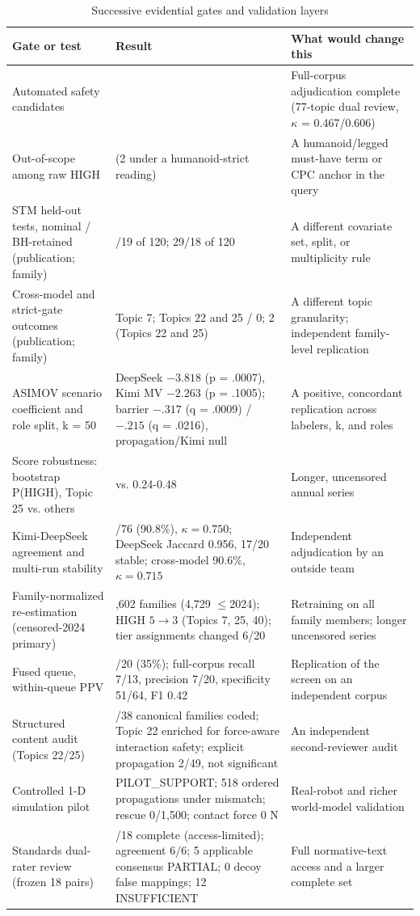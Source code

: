\documentclass[letterpaper,9pt,conference]{ieeeconf}
\begin{document}
\begin{table}[!b]
\centering
\caption{Successive evidential gates and validation layers}
\label{tab:layers}
\scriptsize
\renewcommand{\arraystretch}{0.92}
\begin{tabularx}{\textwidth}{@{}>{\raggedright\arraybackslash}X >{\raggedright\arraybackslash}X >{\raggedright\arraybackslash}X@{}}
\toprule
\textbf{Gate or test} & \textbf{Result} & \textbf{What would change this} \\
\midrule
Automated safety candidates & 20 & Full-corpus adjudication complete (77-topic dual review, $\kappa$ = 0.467/0.606) \\
Out-of-scope among raw HIGH & 1 (2 under a humanoid-strict reading) & A humanoid/legged must-have term or CPC anchor in the query \\
STM held-out tests, nominal / BH-retained (publication; family) & 38/19 of 120; 29/18 of 120 & A different covariate set, split, or multiplicity rule \\
Cross-model and strict-gate outcomes (publication; family) & Topic 7; Topics 22 and 25 / 0; 2 (Topics 22 and 25) & A different topic granularity; independent family-level replication \\
ASIMOV scenario coefficient and role split, k = 50 & DeepSeek $-3.818$ (p = .0007), Kimi MV $-2.263$ (p = .1005); barrier $-.317$ (q = .0009) / $-.215$ (q = .0216), propagation/Kimi null & A positive, concordant replication across labelers, k, and roles \\
Score robustness: bootstrap P(HIGH), Topic 25 vs. others & 0.94 vs. 0.24-0.48 & Longer, uncensored annual series \\
Kimi-DeepSeek agreement and multi-run stability & 69/76 (90.8\%), $\kappa = 0.750$; DeepSeek Jaccard 0.956, 17/20 stable; cross-model 90.6\%, $\kappa = 0.715$ & Independent adjudication by an outside team \\
Family-normalized re-estimation (censored-2024 primary) & 6,602 families (4,729 $\le$2024); HIGH $5\rightarrow3$ (Topics 7, 25, 40); tier assignments changed 6/20 & Retraining on all family members; longer uncensored series \\
Fused queue, within-queue PPV & 7/20 (35\%); full-corpus recall 7/13, precision 7/20, specificity 51/64, F1 0.42 & Replication of the screen on an independent corpus \\
Structured content audit (Topics 22/25) & 49/38 canonical families coded; Topic 22 enriched for force-aware interaction safety; explicit propagation 2/49, not significant & An independent second-reviewer audit \\
Controlled 1-D simulation pilot & PILOT\_SUPPORT; 518 ordered propagations under mismatch; rescue 0/1,500; contact force 0 N & Real-robot and richer world-model validation \\
Standards dual-rater review (frozen 18 pairs) & 6/18 complete (access-limited); agreement 6/6; 5 applicable consensus PARTIAL; 0 decoy false mappings; 12 INSUFFICIENT & Full normative-text access and a larger complete set \\
\bottomrule
\end{tabularx}
\end{table}
\end{document}
